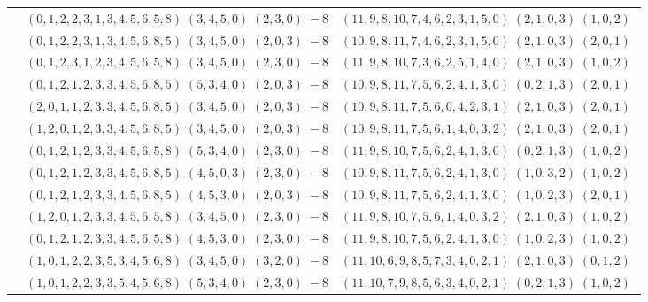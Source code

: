 \documentclass[11pt]{article}
\begin{document}
\begin{longtable}[l]{|c|c|c|}
 \cline{2-3} 
 & $(0 ,1 ,2 ,2 ,3 ,1 ,3 ,4 ,5 ,6 ,5 ,8) \;(3 ,4 ,5 ,0) \;(2 ,3 ,0) \;-8$ & $(11 ,9 ,8 ,10 ,7 ,4 ,6 ,2 ,3 ,1 ,5 ,0) \;(2 ,1 ,0 ,3) \;(1 ,0 ,2) \;$\\ 
 \cline{2-3} 
 & $(0 ,1 ,2 ,2 ,3 ,1 ,3 ,4 ,5 ,6 ,8 ,5) \;(3 ,4 ,5 ,0) \;(2 ,0 ,3) \;-8$ & $(10 ,9 ,8 ,11 ,7 ,4 ,6 ,2 ,3 ,1 ,5 ,0) \;(2 ,1 ,0 ,3) \;(2 ,0 ,1) \;$\\ 
 \cline{2-3} 
 & $(0 ,1 ,2 ,3 ,1 ,2 ,3 ,4 ,5 ,6 ,5 ,8) \;(3 ,4 ,5 ,0) \;(2 ,3 ,0) \;-8$ & $(11 ,9 ,8 ,10 ,7 ,3 ,6 ,2 ,5 ,1 ,4 ,0) \;(2 ,1 ,0 ,3) \;(1 ,0 ,2) \;$\\ 
 \cline{2-3} 
 & $(0 ,1 ,2 ,1 ,2 ,3 ,3 ,4 ,5 ,6 ,8 ,5) \;(5 ,3 ,4 ,0) \;(2 ,0 ,3) \;-8$ & $(10 ,9 ,8 ,11 ,7 ,5 ,6 ,2 ,4 ,1 ,3 ,0) \;(0 ,2 ,1 ,3) \;(2 ,0 ,1) \;$\\ 
 \cline{2-3} 
 & $(2 ,0 ,1 ,1 ,2 ,3 ,3 ,4 ,5 ,6 ,8 ,5) \;(3 ,4 ,5 ,0) \;(2 ,0 ,3) \;-8$ & $(10 ,9 ,8 ,11 ,7 ,5 ,6 ,0 ,4 ,2 ,3 ,1) \;(2 ,1 ,0 ,3) \;(2 ,0 ,1) \;$\\ 
 \cline{2-3} 
 & $(1 ,2 ,0 ,1 ,2 ,3 ,3 ,4 ,5 ,6 ,8 ,5) \;(3 ,4 ,5 ,0) \;(2 ,0 ,3) \;-8$ & $(10 ,9 ,8 ,11 ,7 ,5 ,6 ,1 ,4 ,0 ,3 ,2) \;(2 ,1 ,0 ,3) \;(2 ,0 ,1) \;$\\ 
 \cline{2-3} 
 & $(0 ,1 ,2 ,1 ,2 ,3 ,3 ,4 ,5 ,6 ,5 ,8) \;(5 ,3 ,4 ,0) \;(2 ,3 ,0) \;-8$ & $(11 ,9 ,8 ,10 ,7 ,5 ,6 ,2 ,4 ,1 ,3 ,0) \;(0 ,2 ,1 ,3) \;(1 ,0 ,2) \;$\\ 
 \cline{2-3} 
 & $(0 ,1 ,2 ,1 ,2 ,3 ,3 ,4 ,5 ,6 ,8 ,5) \;(4 ,5 ,0 ,3) \;(2 ,3 ,0) \;-8$ & $(10 ,9 ,8 ,11 ,7 ,5 ,6 ,2 ,4 ,1 ,3 ,0) \;(1 ,0 ,3 ,2) \;(1 ,0 ,2) \;$\\ 
 \cline{2-3} 
 & $(0 ,1 ,2 ,1 ,2 ,3 ,3 ,4 ,5 ,6 ,8 ,5) \;(4 ,5 ,3 ,0) \;(2 ,0 ,3) \;-8$ & $(10 ,9 ,8 ,11 ,7 ,5 ,6 ,2 ,4 ,1 ,3 ,0) \;(1 ,0 ,2 ,3) \;(2 ,0 ,1) \;$\\ 
 \cline{2-3} 
 & $(1 ,2 ,0 ,1 ,2 ,3 ,3 ,4 ,5 ,6 ,5 ,8) \;(3 ,4 ,5 ,0) \;(2 ,3 ,0) \;-8$ & $(11 ,9 ,8 ,10 ,7 ,5 ,6 ,1 ,4 ,0 ,3 ,2) \;(2 ,1 ,0 ,3) \;(1 ,0 ,2) \;$\\ 
 \cline{2-3} 
 & $(0 ,1 ,2 ,1 ,2 ,3 ,3 ,4 ,5 ,6 ,5 ,8) \;(4 ,5 ,3 ,0) \;(2 ,3 ,0) \;-8$ & $(11 ,9 ,8 ,10 ,7 ,5 ,6 ,2 ,4 ,1 ,3 ,0) \;(1 ,0 ,2 ,3) \;(1 ,0 ,2) \;$\\ 
 \cline{2-3} 
 & $(1 ,0 ,1 ,2 ,2 ,3 ,5 ,3 ,4 ,5 ,6 ,8) \;(3 ,4 ,5 ,0) \;(3 ,2 ,0) \;-8$ & $(11 ,10 ,6 ,9 ,8 ,5 ,7 ,3 ,4 ,0 ,2 ,1) \;(2 ,1 ,0 ,3) \;(0 ,1 ,2) \;$\\ 
 \cline{2-3} 
 & $(1 ,0 ,1 ,2 ,2 ,3 ,3 ,5 ,4 ,5 ,6 ,8) \;(5 ,3 ,4 ,0) \;(2 ,3 ,0) \;-8$ & $(11 ,10 ,7 ,9 ,8 ,5 ,6 ,3 ,4 ,0 ,2 ,1) \;(0 ,2 ,1 ,3) \;(1 ,0 ,2) \;$\\ 

\end{longtable}
\end{document}
